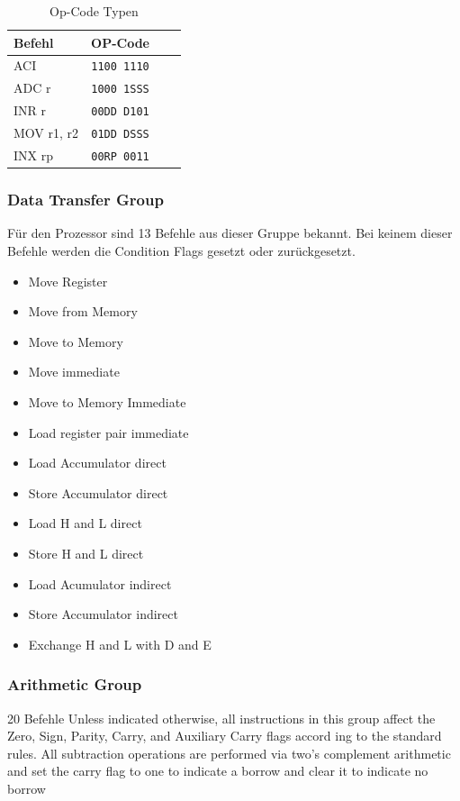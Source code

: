 \documentclass[12pt]{article}
\begin{document}
\begin{table}[h]
\centering
\begin{tabular}{|l|c|c|c| } 
 \hline
 Befehl & OP-Code \\
 \hline 
 ACI & \texttt{1100 1110} \\ 
 ADC r & \texttt{1000 1SSS} \\
 INR r & \texttt{00DD D101} \\
 MOV r1, r2 & \texttt{01DD DSSS} \\
 INX rp & \texttt{00RP 0011} \\
 \hline
\end{tabular}
\caption{Op-Code Typen}
\label{table:opcode}
\end{table}

\subsubsection{Data Transfer Group}
Für den Prozessor sind 13 Befehle aus dieser Gruppe bekannt. Bei keinem dieser Befehle werden die Condition Flags gesetzt oder zurückgesetzt.

\begin{multicols}{2}
\begin{itemize}
\item Move Register
\item Move from Memory
\item Move to Memory
\item Move immediate
\item Move to Memory Immediate
\item Load register pair immediate
\item Load Accumulator direct
\item Store Accumulator direct
\item Load H and L direct
\item Store H and L direct
\item Load Acumulator indirect
\item Store Accumulator indirect
\item Exchange H and L with D and E
\end{itemize}
\end{multicols}


\subsubsection{Arithmetic Group}
20 Befehle
Unless indicated otherwise, all instructions in this
group affect the Zero, Sign, Parity, Carry, and Auxiliary
Carry flags accord ing to the standard rules.
All subtraction operations are performed via two's
complement arithmetic and set the carry flag to one to indicate a borrow and clear it to indicate no borrow
\end{document}
